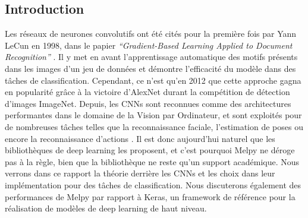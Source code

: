 \begin{multicols}{2}
\tableofcontents
\section{Introduction}
Les réseaux de neurones convolutifs ont été cités pour 
la première fois par Yann LeCun en 1998, dans le papier 
\textit{“Gradient-Based Learning Applied to Document Recognition”} \cite{YannLeCunCNNs}.
Il y met en avant l’apprentissage automatique des motifs présents dans les 
images d’un jeu de données et démontre l’efficacité du modèle dans des tâches
de classification. Cependant, ce n’est qu’en 2012 que cette approche 
gagna en popularité grâce à la victoire d’AlexNet\cite{AlexNet} durant la 
compétition de détection d’images ImageNet. Depuis, les CNNs sont reconnues 
comme des architectures performantes dans le domaine de la Vision par Ordinateur, 
et sont exploités pour de nombreuses tâches telles que la reconnaissance 
faciale, l’estimation de poses ou encore la reconnaissance d’actions 
\cite{ApplicationsOfCNNs}. Il est donc aujourd’hui naturel que les bibliothèques 
de deep learning les proposent, et c’est pourquoi Melpy ne déroge pas à la 
règle, bien que la bibliothèque ne reste qu'un support académique. Nous verrons dans 
ce rapport la théorie derrière les CNNs et les choix 
dans leur implémentation pour des tâches de classification. Nous discuterons 
également des performances de Melpy par rapport à Keras, un framework de 
référence pour la réalisation de modèles de deep learning de haut niveau.
\end{multicols}